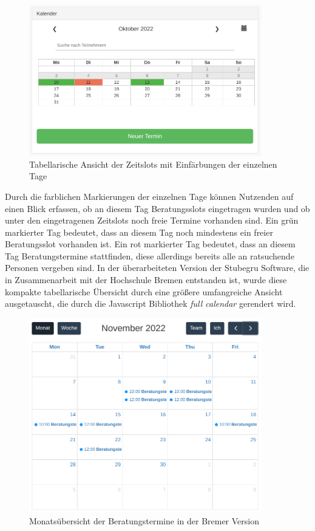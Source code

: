 \documentclass[12pt]{article}
\begin{document}
\begin{figure}[h]
    \caption{Tabellarische Ansicht der Zeitslots mit Einfärbungen der einzelnen Tage}
    \centering
    \includegraphics[width=0.9\textwidth]{screen_old_module.png}
\end{figure}

Durch die farblichen Markierungen der einzelnen Tage können Nutzenden auf einen
Blick erfassen, ob an diesem Tag Beratungsslots eingetragen wurden und ob unter
den eingetragenen Zeitslots noch freie Termine vorhanden sind. Ein grün
markierter Tag bedeutet, dass an diesem Tag noch mindestens ein freier
Beratungsslot vorhanden ist. Ein rot markierter Tag bedeutet, dass an diesem
Tag Beratungstermine stattfinden, diese allerdings bereits alle an ratsuchende
Personen vergeben sind. In der überarbeiteten Version der Stubegru Software,
die in Zusammenarbeit mit der Hochschule Bremen entstanden ist, wurde diese
kompakte tabellarische Übersicht durch eine größere umfangreiche Ansicht
ausgetauscht, die durch die Javascript Bibliothek \textit{full
    calendar}\cite{fullCalendarWeb} gerendert wird.

\begin{figure}[h]
    \caption{Monatsübersicht der Beratungstermine in der Bremer Version}
    \centering
    \includegraphics[width=0.9\textwidth]{screen_bremen_month_view.png}
\end{figure}
\end{document}
